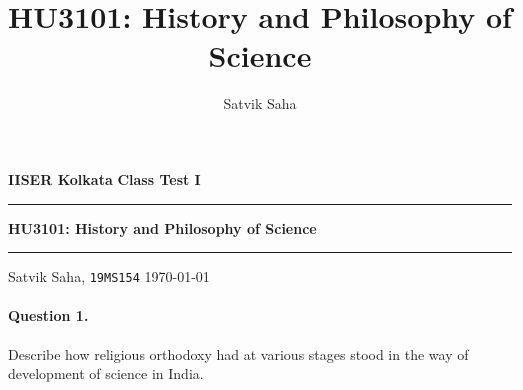 \documentclass[11pt]{article}
\title{HU3101: History and Philosophy of Science}
\author{Satvik Saha}
\date{}
\theoremstyle{remark}
\begin{document}
    \noindent\textbf{IISER Kolkata} \hfill \textbf{Class Test I}
    \vspace{3pt}
    \hrule
    \vspace{3pt}
    \begin{center}
    \LARGE{\textbf{HU3101: History and Philosophy of Science}}
    \end{center}
    \vspace{3pt}
    \hrule
    \vspace{3pt}
    Satvik Saha, \texttt{19MS154} \hfill \today
    \vspace{20pt}

    \paragraph{Question 1.} Describe how religious orthodoxy had at various stages
    stood in the way of development of science in India.
\end{document}
